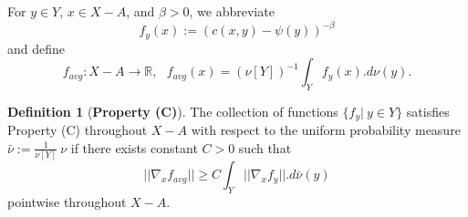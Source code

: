 \documentclass[12pt]{amsart}
\theoremstyle{definition}
\newtheorem{dfn}{Definition}
\theoremstyle{remark}
\newcommand{\bR}{\mathbb{R}}
\begin{document}









For $y\in Y$, $x\in X-A$, and $\beta>0$, we abbreviate 
\begin{equation}\label{fy} f_y(x):=(c(x,y)-\psi(y))^{-\beta} \end{equation} and define \begin{equation}\label{favgdef}
f_{avg}: X-A \to \bR, ~~~f_{avg}(x)=(\nu[Y])^{-1} \int_Y f_y(x).d\nu(y).
\end{equation}

\begin{dfn}[\textbf{Property (C)}] \label{a5spec}
The collection of functions $\{f_y|~y\in Y\}$ satisfies Property (C) throughout $X-A$ with respect to the uniform probability measure $\bar{\nu}:=\frac{1}{\nu[Y]}~\nu$ if there exists constant $C>0$ such that \begin{equation}
||\nabla_x f_{avg}|| \geq C \int_Y ||\nabla_x f_y||.d\bar{\nu}(y) \label{maxineq}
\end{equation}
pointwise throughout $X-A$.
\end{dfn}
\end{document}
